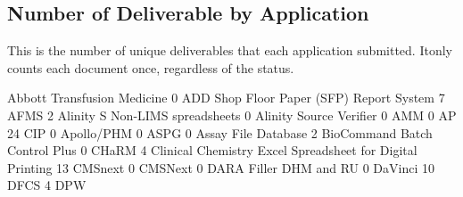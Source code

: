 \documentclass{article}
\begin{document}
\subsection{Number of Deliverable by Application}
This is the number of unique deliverables that each application submitted. Itonly counts
each document once, regardless of the status.
\begin{Schunk}
\begin{Soutput}
                              Abbott Transfusion Medicine 
                                                        0 
                 ADD Shop Floor Paper (SFP) Report System 
                                                        7 
                                                     AFMS 
                                                        2 
                          Alinity S Non-LIMS spreadsheets 
                                                        0 
                                  Alinity Source Verifier 
                                                        0 
                                                      AMM 
                                                        0 
                                                AP 24 CIP 
                                                        0 
                                               Apollo/PHM 
                                                        0 
                                                     ASPG 
                                                        0 
                                      Assay File Database 
                                                        2 
                            BioCommand Batch Control Plus 
                                                        0 
                                                    CHaRM 
                                                        4 
Clinical Chemistry Excel Spreadsheet for Digital Printing 
                                                       13 
                                                  CMSnext 
                                                        0 
                                                  CMSNext 
                                                        0 
                                   DARA Filler DHM and RU 
                                                        0 
                                                  DaVinci 
                                                       10 
                                                     DFCS 
                                                        4 
                                                      DPW 

\end{Soutput}
\end{Schunk}
\end{document}
